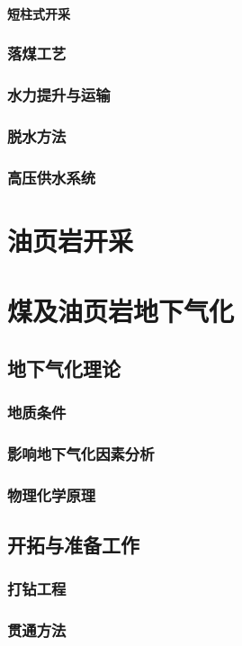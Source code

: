 \documentclass[UTF8]{../../ApplicationUniverse}
\begin{document}
            \paragraph{短柱式开采}
        \subsubsection{落煤工艺}
        \subsubsection{水力提升与运输}
        \subsubsection{脱水方法}
        \subsubsection{高压供水系统}
\section{油页岩开采}
\section{煤及油页岩地下气化}
    \subsection{地下气化理论}
        \subsubsection{地质条件}
        \subsubsection{影响地下气化因素分析}
        \subsubsection{物理化学原理}
    \subsection{开拓与准备工作}
        \subsubsection{打钻工程}
        \subsubsection{贯通方法}
\end{document}
